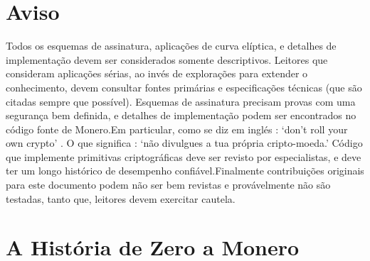 \section{Aviso}
Todos os esquemas de assinatura, aplicações de curva elíptica, e detalhes de  implementação devem ser considerados somente descriptivos. Leitores que consideram aplicações sérias, ao invés de explorações para extender o conhecimento, devem consultar fontes primárias e especificações técnicas (que são citadas sempre que possível).
Esquemas de assinatura precisam provas com uma segurança bem definida, e detalhes de implementação podem ser encontrados no código fonte de Monero.\newline Em particular, como se diz em inglés : `don't roll your own crypto' . O que significa : `não divulgues a tua própria cripto-moeda.' Código que implemente primitivas criptográficas deve ser revisto por especialistas, e deve ter um longo histórico de desempenho confiável.\newline Finalmente contribuições originais para este documento podem não ser bem revistas e provávelmente não são testadas, tanto que, leitores devem exercitar cautela.    
\section{A História de Zero a Monero}

